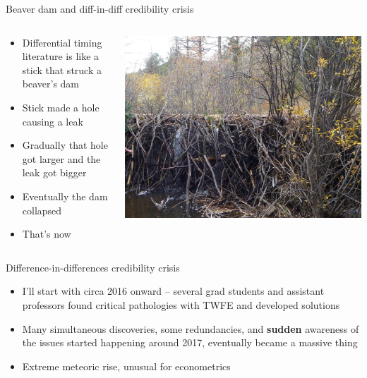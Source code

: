 \documentclass{beamer}
\begin{document}
\begin{frame}{Beaver dam and diff-in-diff credibility crisis}
  \begin{columns}
    \begin{column}{0.5\textwidth}
      \begin{itemize}
\item Differential timing literature is like a stick that struck a beaver's dam
\item Stick made a hole causing a leak
\item Gradually that hole got larger and the leak got bigger
\item Eventually the dam collapsed 
\item That's now
      \end{itemize}
    \end{column}
    \begin{column}{0.5\textwidth}
      \includegraphics[scale=0.25]{./lecture_includes/beaverdam}
    \end{column}
  \end{columns}
\end{frame}





\begin{frame}{Difference-in-differences credibility crisis}

\begin{itemize}
\item I'll start with circa 2016 onward -- several grad students and assistant professors found critical pathologies with TWFE and developed solutions  
\item Many simultaneous discoveries, some redundancies, and \textbf{sudden} awareness of the issues started happening around 2017, eventually became a massive thing
\item Extreme meteoric rise, unusual for econometrics
\end{itemize}

\end{frame}
\end{document}

